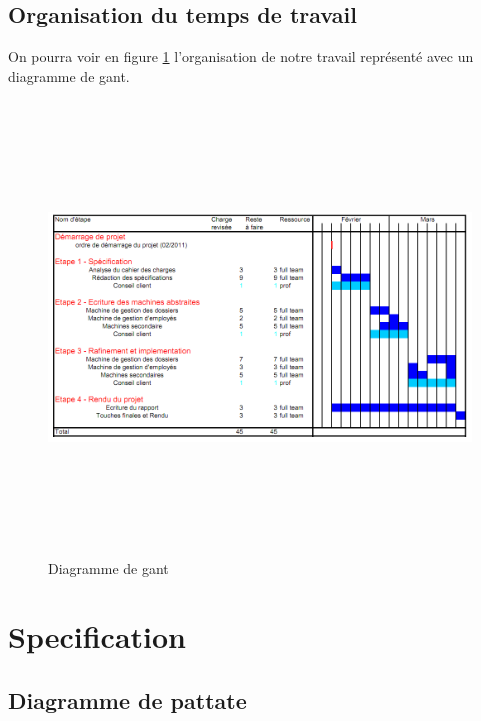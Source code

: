\documentclass[11pt,a4paper]{article}
\begin{document}
\subsection{Organisation du temps de travail}

 On pourra voir en figure \ref{diagant}  l'organisation de notre travail représenté avec un diagramme de gant.


\begin{figure}[h]
\includegraphics[height=12cm,width=17cm]{diaGant.png}
  		\caption{Diagramme de gant}
  		\label{diagant}
\end{figure}



\section{Specification}

\subsection{Diagramme de pattate}
\end{document}
